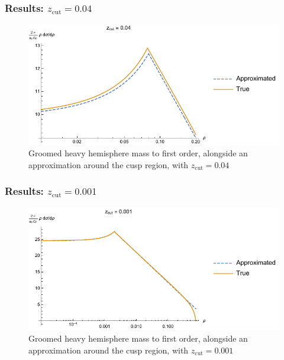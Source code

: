 \documentclass{beamer}
\newcommand{\zcut}{z_\mathrm{cut}}
\begin{document}
	\begin{frame}
		\frametitle{Results: $\zcut = 0.04$}

		\begin{figure}
			\includegraphics[width=\columnwidth]{figures/approximation_zoomed.pdf}
			\caption{Groomed heavy hemisphere mass to first order, alongside an approximation around the cusp region, with $\zcut = 0.04$}
		\end{figure}
	\end{frame}

	\begin{frame}
		\frametitle{Results: $\zcut = 0.001$}

		\begin{figure}
			\includegraphics[width=\columnwidth]{figures/approximation_small_zcut.pdf}
			\caption{Groomed heavy hemisphere mass to first order, alongside an approximation around the cusp region, with $\zcut = 0.001$}
		\end{figure}
	\end{frame}
\end{document}
